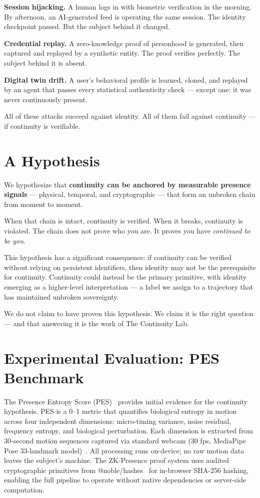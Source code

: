 \documentclass[conference]{IEEEtran}
\begin{document}
\textbf{Session hijacking.} A human logs in with biometric verification in the morning. By afternoon, an AI-generated feed is operating the same session. The identity checkpoint passed. But the subject behind it changed.

\textbf{Credential replay.} A zero-knowledge proof of personhood is generated, then captured and replayed by a synthetic entity. The proof verifies perfectly. The subject behind it is absent.

\textbf{Digital twin drift.} A user's behavioral profile is learned, cloned, and replayed by an agent that passes every statistical authenticity check — except one: it was never continuously present.

All of these attacks succeed against identity. All of them fail against continuity — if continuity is verifiable.

\section{A Hypothesis}

We hypothesize that \textbf{continuity can be anchored by measurable presence signals} — physical, temporal, and cryptographic — that form an unbroken chain from moment to moment.

When that chain is intact, continuity is verified. When it breaks, continuity is violated. The chain does not prove who you are. It proves you have \textit{continued to be you}.

This hypothesis has a significant consequence: if continuity can be verified without relying on persistent identifiers, then identity may not be the prerequisite for continuity. Continuity could instead be the primary primitive, with identity emerging as a higher-level interpretation — a label we assign to a trajectory that has maintained unbroken sovereignty.

We do not claim to have proven this hypothesis. We claim it is the right question — and that answering it is the work of The Continuity Lab.

\section{Experimental Evaluation: PES Benchmark}

The Presence Entropy Score (PES)~\cite{pes-benchmark} provides initial evidence for the continuity hypothesis. PES is a 0--1 metric that quantifies biological entropy in motion across four independent dimensions: micro-timing variance, noise residual, frequency entropy, and biological perturbation. Each dimension is extracted from 30-second motion sequences captured via standard webcam (30 fps, MediaPipe Pose 33-landmark model)~\cite{motion-signature}. All processing runs on-device; no raw motion data leaves the subject's machine. The ZK-Presence proof system uses audited cryptographic primitives from @noble/hashes~\cite{noble} for in-browser SHA-256 hashing, enabling the full pipeline to operate without native dependencies or server-side computation.
\end{document}
